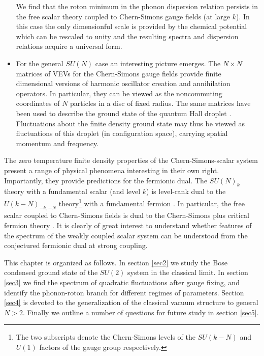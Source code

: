 \begin{itemize}
{ We find that the roton minimum in the phonon dispersion relation persists in the free scalar theory coupled to Chern-Simons gauge fields (at large $k$). In this case the only dimensionful scale is provided by the chemical potential which can be rescaled to unity and the resulting spectra and dispersion relations acquire a universal form.  }
 \item{For the general $SU(N)$ case an interesting picture emerges. The $N\times N$ matrices of VEVs for the Chern-Simons gauge fields provide  finite dimensional versions of harmonic oscillator  creation and annihilation operators. In particular, they can be viewed as the noncommuting coordinates of $N$ particles in a disc of fixed radius. The same matrices have been used to describe the ground state of the quantum Hall droplet \cite{Polychronakos:2001mi, Susskind:2001fb}. Fluctuations about the finite density ground state  may thus be viewed as fluctuations of this droplet (in configuration space), carrying spatial momentum and frequency.}
  \end{itemize}
 The zero temperature finite density properties of the Chern-Simons-scalar system present a range of physical phenomena interesting in their own right. Importantly, they provide predictions for the fermionic dual.  The $SU(N)_k$  theory with a fundamental scalar (and level $k$) is level-rank dual to the $U(k-N)_{-k, -N}$ theory\footnote{The two subscripts denote the Chern-Simons levels of the $SU(k-N)$ and $U(1)$ factors of the gauge group respectively.} with a fundamental fermion \cite{Aharony:2015mjs}. In particular, the free scalar coupled to Chern-Simons fields is dual to the Chern-Simons plus critical fermion theory \cite{Minwalla:2015sca}. It is clearly of great interest to understand whether features of the spectrum of the weakly coupled scalar system can be understood from the conjectured fermionic dual at strong coupling.
 
 This chapter is organized as follows. In section \ref{sec2} we study the Bose condensed ground state of the $SU(2)$ system in the classical limit. In section \ref{sec3} we find the spectrum of quadratic fluctuations after gauge fixing, and identify the phonon-roton branch for different regimes of parameters. Section \ref{sec4} is devoted to the generalization of the classical vacuum structure to general $N>2$.  Finally we outline a number of questions for future study in section \ref{sec5}.
 
